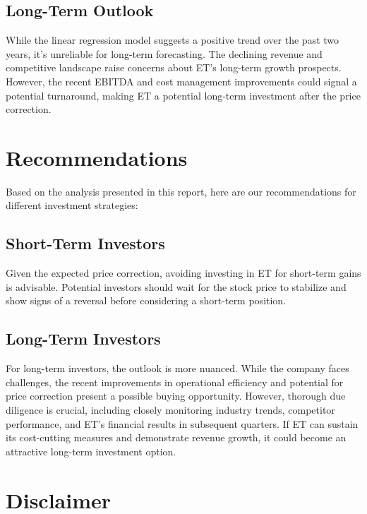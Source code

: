 \documentclass[9pt,a4paper,twoside]{tau}
\begin{document}
    \subsection{Long-Term Outlook}

        While the linear regression model suggests a positive trend over the past two years, it's unreliable for long-term forecasting. The declining revenue and competitive landscape raise concerns about ET's long-term growth prospects. However, the recent EBITDA and cost management improvements could signal a potential turnaround, making ET a potential long-term investment after the price correction. 

\section{Recommendations}

    Based on the analysis presented in this report, here are our recommendations for different investment strategies:

    \subsection{Short-Term Investors}

        Given the expected price correction, avoiding investing in ET for short-term gains is advisable. Potential investors should wait for the stock price to stabilize and show signs of a reversal before considering a short-term position.

    \subsection{Long-Term Investors}

        For long-term investors, the outlook is more nuanced. While the company faces challenges, the recent improvements in operational efficiency and potential for price correction present a possible buying opportunity. However, thorough due diligence is crucial, including closely monitoring industry trends, competitor performance, and ET's financial results in subsequent quarters. If ET can sustain its cost-cutting measures and demonstrate revenue growth, it could become an attractive long-term investment option.

\section{Disclaimer}
\end{document}
